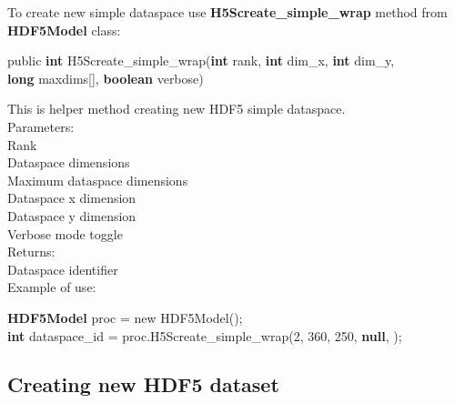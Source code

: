 \documentclass[11p]{article}
\begin{document}
To create new simple dataspace use {\bf H5Screate\_simple\_wrap} method from
{\bf HDF5Model} class:
\begin{kod}
public {\bf int} H5Screate\_simple\_wrap({\bf int} rank, {\bf int} dim\_x, {\bf int} dim\_y,\\
\hspace*{0.5cm} {\bf long} maxdims[], {\bf boolean} verbose)
\end{kod}
This is helper method creating new HDF5 simple dataspace.\\
Parameters:\\
\hspace*{0.5cm}{\bf rank} Rank\\
\hspace*{0.5cm}{\bf dims} Dataspace dimensions\\
\hspace*{0.5cm}{\bf maxdims} Maximum dataspace dimensions\\
\hspace*{0.5cm}{\bf dim\_x} Dataspace x dimension\\
\hspace*{0.5cm}{\bf dim\_y} Dataspace y dimension\\
\hspace*{0.5cm}{\bf verbose} Verbose mode toggle\\
Returns:\\
\hspace*{0.5cm}Dataspace identifier\\

Example of use:
\begin{kod}
{\bf HDF5Model} proc = new HDF5Model();\\
{\bf int} dataspace\_id = proc.H5Screate\_simple\_wrap(2, 360, 250, {\bf null},
\hspace*{0.5cm}{\bf true});
\end{kod}

\subsection{Creating new HDF5 dataset}
\end{document}
